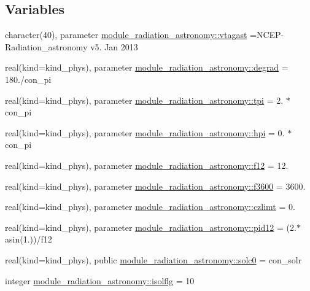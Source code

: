 \subsection*{Variables}
\begin{DoxyCompactItemize}
\item 
character(40), parameter \hyperlink{namespacemodule__radiation__astronomy_aa3497dc9fa4bbd8248fdf0f2784c268a}{module\+\_\+radiation\+\_\+astronomy\+::vtagast} =\textquotesingle{}N\+C\+EP-\/Radiation\+\_\+astronomy v5. Jan 2013 \textquotesingle{}
\item 
real(kind=kind\+\_\+phys), parameter \hyperlink{namespacemodule__radiation__astronomy_a220d2b997b3073cf2985d62111c5405d}{module\+\_\+radiation\+\_\+astronomy\+::degrad} = 180./con\+\_\+pi
\item 
real(kind=kind\+\_\+phys), parameter \hyperlink{namespacemodule__radiation__astronomy_a4fbf4be04e17f1f8d0674ee2e20506b0}{module\+\_\+radiation\+\_\+astronomy\+::tpi} = 2. $\ast$ con\+\_\+pi
\item 
real(kind=kind\+\_\+phys), parameter \hyperlink{namespacemodule__radiation__astronomy_a7369d8561566f5e7e51ccc40e09f2520}{module\+\_\+radiation\+\_\+astronomy\+::hpi} = 0. $\ast$ con\+\_\+pi
\item 
real(kind=kind\+\_\+phys), parameter \hyperlink{namespacemodule__radiation__astronomy_ad59856e8f877eb05a6b22610f14a391d}{module\+\_\+radiation\+\_\+astronomy\+::f12} = 12.
\item 
real(kind=kind\+\_\+phys), parameter \hyperlink{namespacemodule__radiation__astronomy_a37b491dde50d06e339effb4a31d9f245}{module\+\_\+radiation\+\_\+astronomy\+::f3600} = 3600.
\item 
real(kind=kind\+\_\+phys), parameter \hyperlink{namespacemodule__radiation__astronomy_afeb2fccbe8137de6099a09035762ff5e}{module\+\_\+radiation\+\_\+astronomy\+::czlimt} = 0.
\item 
real(kind=kind\+\_\+phys), parameter \hyperlink{namespacemodule__radiation__astronomy_adbf9cdfc7b55d882f015a4bc4ef276ab}{module\+\_\+radiation\+\_\+astronomy\+::pid12} = (2.$\ast$asin(1.))/f12
\item 
real(kind=kind\+\_\+phys), public \hyperlink{namespacemodule__radiation__astronomy_a37e08872f67023b11f839ac15151af09}{module\+\_\+radiation\+\_\+astronomy\+::solc0} = con\+\_\+solr
\item 
integer \hyperlink{namespacemodule__radiation__astronomy_a7ea431b6d4f4d6ee1f6545d6baeee44f}{module\+\_\+radiation\+\_\+astronomy\+::isolflg} = 10

\end{DoxyCompactItemize}
